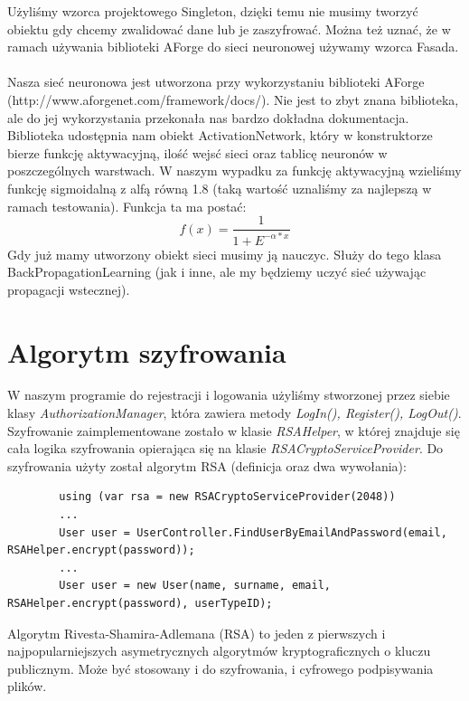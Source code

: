\documentclass[12pt,a4paper]{article}
\begin{document}
Użyliśmy wzorca projektowego Singleton, dzięki temu nie musimy tworzyć obiektu gdy chcemy zwalidować dane lub je zaszyfrować. Można też uznać, że w ramach używania biblioteki AForge do sieci neuronowej używamy wzorca Fasada.\\\\

Nasza sieć neuronowa jest utworzona przy wykorzystaniu biblioteki AForge \\(http://www.aforgenet.com/framework/docs/). Nie jest to zbyt znana biblioteka, ale do jej wykorzystania przekonała nas bardzo dokładna dokumentacja.\\
Biblioteka udostępnia nam obiekt ActivationNetwork, który w konstruktorze bierze funkcję aktywacyjną, ilość wejsć sieci oraz tablicę neuronów w poszczególnych warstwach. W naszym wypadku za funkcję aktywacyjną wzieliśmy funkcję sigmoidalną z alfą równą 1.8 (taką wartość uznaliśmy za najlepszą w ramach testowania). Funkcja ta ma postać:
\begin{equation}
f(x)=\dfrac{1}{1+E^{-\alpha *x}}
\end{equation}
 Gdy już mamy utworzony obiekt sieci musimy ją nauczyc. Służy do tego klasa BackPropagationLearning (jak i inne, ale my będziemy uczyć sieć używając propagacji wstecznej).
	
\section*{Algorytm szyfrowania}
	
	
	W naszym programie do rejestracji i logowania użyliśmy stworzonej przez siebie klasy \emph{AuthorizationManager}, która zawiera metody \emph{LogIn(), Register(), LogOut()}.
	Szyfrowanie zaimplementowane zostało w klasie \emph{RSAHelper}, w której znajduje się cała logika szyfrowania opierająca się na klasie \emph{RSACryptoServiceProvider}.
	Do szyfrowania użyty został algorytm RSA (definicja oraz dwa wywołania):
	\begin{lstlisting}
		using (var rsa = new RSACryptoServiceProvider(2048))
		...
		User user = UserController.FindUserByEmailAndPassword(email, RSAHelper.encrypt(password));
		...
		User user = new User(name, surname, email, RSAHelper.encrypt(password), userTypeID);
	\end{lstlisting}

	



	Algorytm Rivesta-Shamira-Adlemana (RSA) to jeden z pierwszych i najpopularniejszych asymetrycznych algorytmów kryptograficznych o kluczu publicznym. Może być stosowany i do szyfrowania, i cyfrowego podpisywania plików.
	
\end{document}
